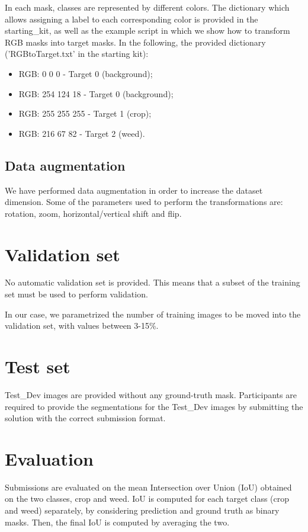 \documentclass[12pt,a4paper]{report}
\begin{document}
In each mask, classes are represented by different colors. The dictionary which allows assigning a label to each corresponding color is provided in the starting\_kit, as well as the example script in which we show how to transform RGB masks into target masks. In the following, the provided dictionary ('RGBtoTarget.txt' in the starting kit):
			\begin{itemize}
				\item RGB: 0 0 0 - Target 0 (background);
				\item RGB: 254 124 18 - Target 0 (background);
				\item RGB: 255 255 255 - Target 1 (crop);
				\item RGB: 216 67 82 - Target 2 (weed).
			\end{itemize}

	\subsection{Data augmentation}
We have performed data augmentation in order to increase the dataset dimension. Some of the parameters used to perform the transformations are: rotation, zoom, horizontal/vertical shift and flip.

	\section{Validation set}

No automatic validation set is provided. This means that a subset of the training set must be used to perform validation.

In our case, we parametrized the number of training images to be moved into the validation set, with values between 3-15\%.


	\section{Test set}
Test\_Dev images are provided without any ground-truth mask. Participants are required to provide the segmentations for the Test\_Dev images by submitting the solution with the correct submission format. 
	\section{Evaluation}
Submissions are evaluated on the mean Intersection over Union (IoU) obtained on the two classes, crop and weed. IoU is computed for each target class (crop and weed) separately, by considering prediction and ground truth as binary masks. Then, the final IoU is computed by averaging the two.
\end{document}

